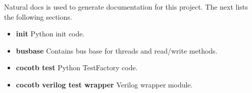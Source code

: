 \par
Natural docs is used to generate documentation for this project. The next lists the following sections.

\begin{itemize}
  \item \textbf{init} Python init code.\\
  \item \textbf{busbase} Contains bus base for threads and read/write methods.\\
  \item \textbf{cocotb test} Python TestFactory code.\\
  \item \textbf{cocotb verilog test wrapper} Verilog wrapper module.\\
\end{itemize}

